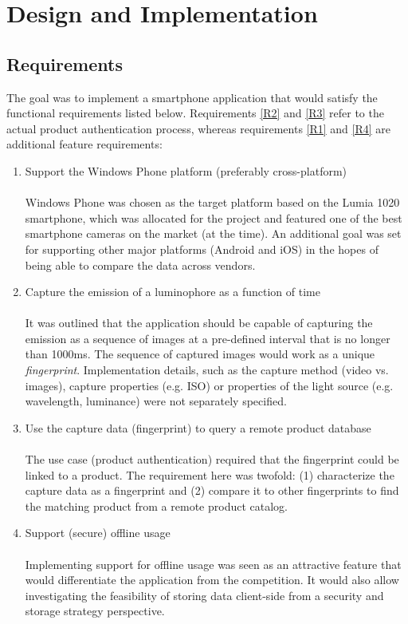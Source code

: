 \documentclass[thesis.tex]{subfiles}
\begin{document}
\chapter{Design and Implementation}
\label{chapter:design-implementation}

\section{Requirements}

The goal was to implement a smartphone application that would satisfy the functional requirements listed below. Requirements \ref{R2} and \ref{R3} refer to the actual product authentication process, whereas requirements \ref{R1} and \ref{R4} are additional feature requirements:

\begin{enumerate}[leftmargin=0.55in, label=\textbf{R\arabic*}]
	\item \label{R1} Support the Windows Phone platform (preferably cross-platform)\\ \\
	Windows Phone was chosen as the target platform based on the Lumia 1020 smartphone, which was allocated for the project and featured one of the best smartphone cameras on the market (at the time). An additional goal was set for supporting other major platforms (Android and iOS) in the hopes of being able to compare the data across vendors.

    \item \label{R2} Capture the emission of a luminophore as a function of time\\ \\
    It was outlined that the application should be capable of capturing the emission as a sequence of images at a pre-defined interval that is no longer than 1000ms. The sequence of captured images would work as a unique \emph{fingerprint}. Implementation details, such as the capture method (video vs. images), capture properties (e.g. ISO) or properties of the light source (e.g. wavelength, luminance) were not separately specified.

    \item \label{R3} Use the capture data (fingerprint) to query a remote product database\\ \\
    The use case (product authentication) required that the fingerprint could be linked to a product. The requirement here was twofold: (1) characterize the capture data as a fingerprint and (2) compare it to other fingerprints to find the matching product from a remote product catalog.

	\item \label{R4} Support (secure) offline usage\\ \\
	Implementing support for offline usage was seen as an attractive feature that would differentiate the application from the competition. It would also allow investigating the feasibility of storing data client-side from a security and storage strategy perspective.
\end{enumerate}
\end{document}
